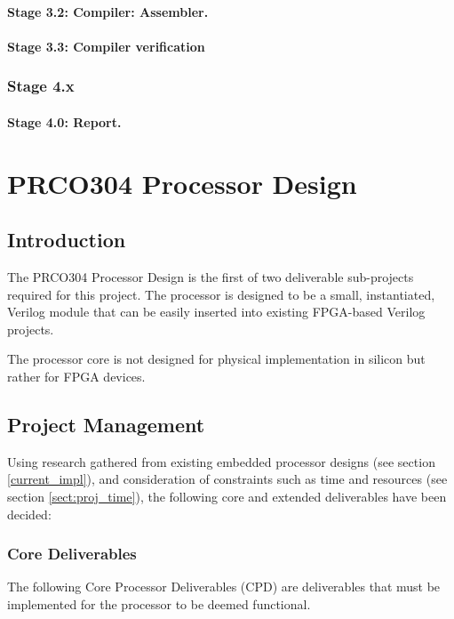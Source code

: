 \documentclass[11pt,a4paper]{report}
\newcommand{\scname}{PRCO304}
\begin{document}
\subsubsection*{Stage 3.2: Compiler: Assembler.}
\subsubsection*{Stage 3.3: Compiler verification}

\subsection*{Stage 4.x}
\subsubsection*{Stage 4.0: Report.}




\chapter{\scname{} Processor Design}
{\hypersetup{linkcolor=black}
\startcontents[chapters]
}


\section{Introduction}
The \scname{} Processor Design is the first of two deliverable sub-projects required for this project. The processor is designed to be a small, instantiated, Verilog module that can be easily inserted into existing FPGA-based Verilog projects.

The processor core is not designed for physical implementation in silicon but rather for FPGA devices.


\newpage
\section{Project Management}
Using research gathered from existing embedded processor designs (see section \ref{current_impl}), and consideration of constraints such as time and resources (see section \ref{sect:proj_time}), the following core and extended deliverables have been decided:

\subsection{Core Deliverables}
The following Core Processor Deliverables (CPD) are deliverables that must be implemented for the processor to be deemed functional.
\end{document}
